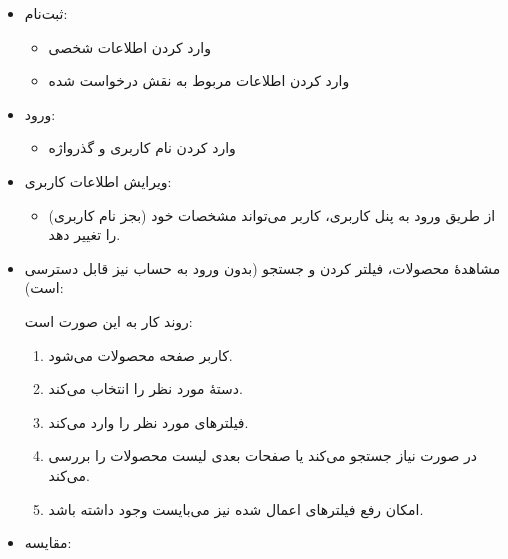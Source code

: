 \documentclass[]{article}
\begin{document}
\begin{itemize}

\item
ثبت‌نام:

\begin{itemize}
\item
وارد کردن اطلاعات شخصی

\item
وارد کردن اطلاعات مربوط به نقش درخواست شده

\end{itemize}

\item
ورود:
\begin{itemize}
\item
وارد کردن نام کاربری و گذرواژه

\end{itemize}

\item
ویرایش اطلاعات کاربری:

\begin{itemize}
\item
از طریق ورود به پنل کاربری، کاربر می‌تواند مشخصات خود (بجز نام کاربری) را تغییر دهد.

\end{itemize}

\item
مشاهدهٔ محصولات، فیلتر کردن و جستجو (بدون ورود به حساب نیز قابل دسترسی است):

روند کار به این صورت است:

\begin{enumerate}

\item
کاربر صفحه محصولات می‌شود.

\item
دستهٔ مورد نظر را انتخاب می‌کند.

\item
فیلتر‌های مورد نظر را وارد می‌کند.

\item
در صورت نیاز جستجو می‌کند یا صفحات بعدی لیست محصولات را بررسی می‌کند. 

\item
امکان رفع فیلترهای اعمال شده نیز می‌بایست وجود داشته باشد.

\end{enumerate}

\item
مقایسه:

\begin{itemize}


\end{itemize}
\end{itemize}
\end{document}
